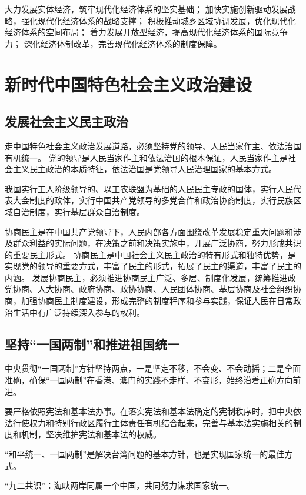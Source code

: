 \documentclass[a4paper, UTF8]{ctexart}
\begin{document}
    大力发展实体经济，筑牢现代化经济体系的坚实基础；
    加快实施创新驱动发展战略，强化现代化经济体系的战略支撑；
    积极推动城乡区域协调发展，优化现代化经济体系的空间布局；
    着力发展开放型经济，提高现代化经济体系的国际竞争力；
    深化经济体制改革，完善现代化经济体系的制度保障。

\section{新时代中国特色社会主义政治建设}
    \subsection{发展社会主义民主政治}
    走中国特色社会主义政治发展道路，必须坚持党的领导、人民当家作主、依法治国有机统一。
    党的领导是人民当家作主和依法治国的根本保证，人民当家作主是社会主义民主政治的本质特征，依法治国是党领导人民治理国家的基本方式。

    我国实行工人阶级领导的、以工农联盟为基础的人民民主专政的国体，实行人民代表大会制度的政体，实行中国共产党领导的多党合作和政治协商制度，实行民族区域自治制度，实行基层群众自治制度。

    协商民主是在中国共产党领导下，人民内部各方面围绕改革发展稳定重大问题和涉及群众利益的实际问题，在决策之前和决策实施中，开展广泛协商，努力形成共识的重要民主形式。
    协商民主是中国社会主义民主政治的特有形式和独特优势，是实现党的领导的重要方式，丰富了民主的形式，拓展了民主的渠道，丰富了民主的内涵。
    发展协商民主，必须推进协商民主广泛、多层、制度化发展，统筹推进政党协商、人大协商、政府协商、政协协商、人民团体协商、基层协商及社会组织协商，加强协商民主制度建设，形成完整的制度程序和参与实践，保证人民在日常政治生活中有广泛持续深入参与的权利。

    \subsection{坚持“一国两制”和推进祖国统一}
    中央贯彻“一国两制”方针坚持两点，一是坚定不移，不会变、不会动摇；二是全面准确，确保“一国两制”在香港、澳门的实践不走样、不变形，始终沿着正确方向前进。

    要严格依照宪法和基本法办事。在落实宪法和基本法确定的宪制秩序时，把中央依法行使权力和特别行政区履行主体责任有机结合起来，完善与基本法实施相关的制度和机制，坚决维护宪法和基本法的权威。


    “和平统一、一国两制”是解决台湾问题的基本方针，也是实现国家统一的最佳方式。

    “九二共识”：海峡两岸同属一个中国，共同努力谋求国家统一。
\end{document}
